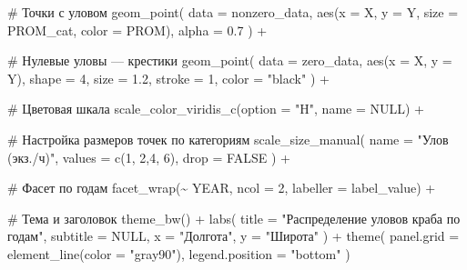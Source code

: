 \documentclass[
  letterpaper,
  DIV=11,
  numbers=noendperiod]{scrreprt}
\newenvironment{Shaded}{\begin{snugshade}}{\end{snugshade}}
\newcommand{\AttributeTok}[1]{\textcolor[rgb]{0.40,0.45,0.13}{#1}}
\newcommand{\CommentTok}[1]{\textcolor[rgb]{0.37,0.37,0.37}{#1}}
\newcommand{\ConstantTok}[1]{\textcolor[rgb]{0.56,0.35,0.01}{#1}}
\newcommand{\DecValTok}[1]{\textcolor[rgb]{0.68,0.00,0.00}{#1}}
\newcommand{\FloatTok}[1]{\textcolor[rgb]{0.68,0.00,0.00}{#1}}
\newcommand{\FunctionTok}[1]{\textcolor[rgb]{0.28,0.35,0.67}{#1}}
\newcommand{\NormalTok}[1]{\textcolor[rgb]{0.00,0.23,0.31}{#1}}
\newcommand{\SpecialCharTok}[1]{\textcolor[rgb]{0.37,0.37,0.37}{#1}}
\newcommand{\StringTok}[1]{\textcolor[rgb]{0.13,0.47,0.30}{#1}}
\begin{document}
\begin{Shaded}
\begin{Highlighting}[]
  \CommentTok{\# Точки с уловом}
  \FunctionTok{geom\_point}\NormalTok{(}
    \AttributeTok{data =}\NormalTok{ nonzero\_data,}
    \FunctionTok{aes}\NormalTok{(}\AttributeTok{x =}\NormalTok{ X, }\AttributeTok{y =}\NormalTok{ Y, }\AttributeTok{size =}\NormalTok{ PROM\_cat, }\AttributeTok{color =}\NormalTok{ PROM),}
    \AttributeTok{alpha =} \FloatTok{0.7}
\NormalTok{  ) }\SpecialCharTok{+}
  
  \CommentTok{\# Нулевые уловы — крестики}
  \FunctionTok{geom\_point}\NormalTok{(}
    \AttributeTok{data =}\NormalTok{ zero\_data,}
    \FunctionTok{aes}\NormalTok{(}\AttributeTok{x =}\NormalTok{ X, }\AttributeTok{y =}\NormalTok{ Y),}
    \AttributeTok{shape =} \DecValTok{4}\NormalTok{, }\AttributeTok{size =} \FloatTok{1.2}\NormalTok{, }\AttributeTok{stroke =} \DecValTok{1}\NormalTok{, }\AttributeTok{color =} \StringTok{"black"}
\NormalTok{  ) }\SpecialCharTok{+}
  
  \CommentTok{\# Цветовая шкала}
  \FunctionTok{scale\_color\_viridis\_c}\NormalTok{(}\AttributeTok{option =} \StringTok{"H"}\NormalTok{, }\AttributeTok{name =} \ConstantTok{NULL}\NormalTok{) }\SpecialCharTok{+}
  
  \CommentTok{\# Настройка размеров точек по категориям}
  \FunctionTok{scale\_size\_manual}\NormalTok{(}
    \AttributeTok{name =} \StringTok{"Улов (экз./ч)"}\NormalTok{,}
    \AttributeTok{values =} \FunctionTok{c}\NormalTok{(}\DecValTok{1}\NormalTok{, }\DecValTok{2}\NormalTok{,}\DecValTok{4}\NormalTok{, }\DecValTok{6}\NormalTok{),}
    \AttributeTok{drop =} \ConstantTok{FALSE}
\NormalTok{  ) }\SpecialCharTok{+}
  
  \CommentTok{\# Фасет по годам}
  \FunctionTok{facet\_wrap}\NormalTok{(}\SpecialCharTok{\textasciitilde{}}\NormalTok{ YEAR, }\AttributeTok{ncol =} \DecValTok{2}\NormalTok{, }\AttributeTok{labeller =}\NormalTok{ label\_value) }\SpecialCharTok{+}
  
  \CommentTok{\# Тема и заголовок}
  \FunctionTok{theme\_bw}\NormalTok{() }\SpecialCharTok{+}
  \FunctionTok{labs}\NormalTok{(}
    \AttributeTok{title =} \StringTok{"Распределение уловов краба по годам"}\NormalTok{,}
    \AttributeTok{subtitle =} \ConstantTok{NULL}\NormalTok{,}
    \AttributeTok{x =} \StringTok{"Долгота"}\NormalTok{, }
    \AttributeTok{y =} \StringTok{"Широта"}
\NormalTok{  ) }\SpecialCharTok{+}
  \FunctionTok{theme}\NormalTok{(}
    \AttributeTok{panel.grid =} \FunctionTok{element\_line}\NormalTok{(}\AttributeTok{color =} \StringTok{"gray90"}\NormalTok{),}
    \AttributeTok{legend.position =} \StringTok{"bottom"}
\NormalTok{  )}
\end{Highlighting}
\end{Shaded}
\end{document}
